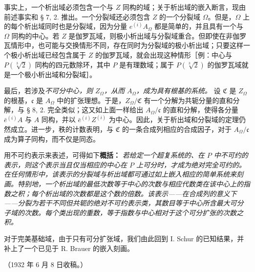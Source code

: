\documentclass[11pt]{article}
\providecommand{\srcspaced}[1]{#1}
\begin{document}
事实上，一个析出域必须包含一个与 \(Z\) 同构的域；关于析出域的嵌入断言，现由前述事实和 § 7, 2. 推出。一个分裂域还必须包含 \(Z\) 的一个分裂域 \(\Omega\)。但是，\(\Omega\) 上的每个析出域同时也是分裂域，因为分量 \(e^{(i)}A_\Omega\) 都是简单的，并且具有一个与 \(\Omega\) 同构的中心。若 \(Z\) 是伽罗瓦域，则极小析出域与分裂域重合。但即使在非伽罗瓦情形中，也可能与交换情形不同，存在同时为分裂域的极小析出域；只要这样一个极小析出域已经包含属于 \(Z\) 的伽罗瓦域，就会出现这种情形［例：中心与 \(P(\sqrt[3]{2})\) 同构的四元数除环，其中 \(P\) 是有理数域；属于 \(P(\sqrt[3]{2})\) 的伽罗瓦域就是一个极小析出域和分裂域］。

最后，若涉及\emph{不可分中心，则 \(Z_\Omega\)，从而 \(A_\Omega\)，成为具有根基的系统。} 设 \(\mathfrak C\) 是 \(Z_\Omega\) 的根基，\(\mathfrak c\) 是 \(A_\Omega\) 中的扩张理想。于是，\(Z_\Omega/\mathfrak C\) 有一个分解为共轭分量的直和分解，与 § 8, 2. 完全类似；这又如上面一样给出 \(A_\Omega/\mathfrak c\) 的直和分解，使得各分量 \(\bar e^{(i)}A\) 与 \(A\) 同构，并以 \(\bar e^{(i)}Z^{(i)}\) 为中心。因此，关于析出域和分裂域的定理仍然成立。进一步，秩的计数表明，与 \(\mathfrak C\) 的一条合成列相应的合成因子，对于 \(A_\Omega/\mathfrak c\) 成为算子同构，而不仅是同态。

用不可约表示来表述，可得如下\textbf{\srcspaced{概括：}} \emph{若给定一个超复系统的、在 \(P\) 中不可约的表示，则这个表示当且仅当相应的中心在 \(P\) 上可分时，才成为绝对完全可约的。在任何情形中，该表示的分裂域与析出域都可通过如上嵌入相应的简单系统来刻画。特别地，一个析出域的最低次数等于中心的次数与相应代数类在该中心上的指数之积；每个析出域的次数都是这个数的倍数。该表示——在合成列的意义下——分裂为若干不同但共轭的绝对不可约表示类，其数目等于中心所含最大可分子域的次数。每个类出现的重数，等于指数与中心相对于这个可分扩张的次数之积。}

对于完美基础域，由于只有可分扩张域，我们由此回到 I. Schur 的已知结果，并补上了一个已见于 R. Brauer 的嵌入刻画。

\begin{center}
（1932 年 6 月 8 日收稿。）
\end{center}

\clearpage

\setcounter{footnote}{0}
\end{document}
